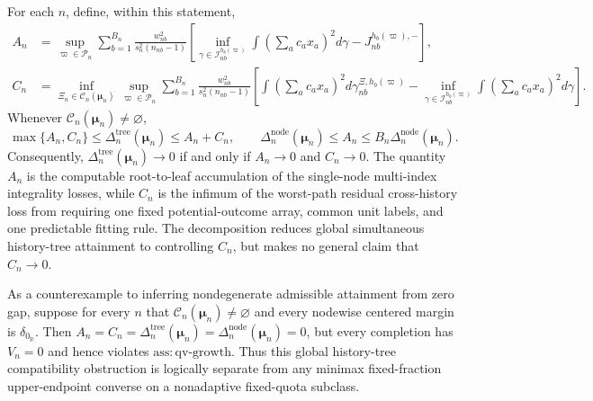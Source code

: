For each \(n\), define, within this statement,
\[
 \begin{aligned}
 A_n&=\sup_{\varpi\in\mathcal P_n}\sum_{b=1}^{B_n}
 \frac{w_{nb}^2}{s_n^2(n_{nb}-1)}\left[
 \inf_{\gamma\in\mathcal I_{nb}^{h_b(\varpi)}}\int\left(\sum_ac_ax_a\right)^2d\gamma-J_{nb}^{h_b(\varpi),-}\right],\\
 C_n&=\inf_{\Xi_n\in\mathcal C_n(\boldsymbol\mu_n)}\sup_{\varpi\in\mathcal P_n}
 \sum_{b=1}^{B_n}\frac{w_{nb}^2}{s_n^2(n_{nb}-1)}\left[
 \int\left(\sum_ac_ax_a\right)^2d\gamma_{nb}^{\Xi,h_b(\varpi)}
 -\inf_{\gamma\in\mathcal I_{nb}^{h_b(\varpi)}}\int\left(\sum_ac_ax_a\right)^2d\gamma\right].
 \end{aligned}
\]
Whenever \(\mathcal C_n(\boldsymbol\mu_n)\ne\varnothing\),
\[
 \max\{A_n,C_n\}\le\Delta_n^{\mathrm{tree}}(\boldsymbol\mu_n)\le A_n+C_n,
 \qquad
 \Delta_n^{\mathrm{node}}(\boldsymbol\mu_n)\le A_n\le B_n\Delta_n^{\mathrm{node}}(\boldsymbol\mu_n).
\]
Consequently, \(\Delta_n^{\mathrm{tree}}(\boldsymbol\mu_n)\to0\) if and only if \(A_n\to0\) and \(C_n\to0\).  The quantity \(A_n\) is the computable root-to-leaf accumulation of the single-node multi-index integrality losses, while \(C_n\) is the infimum of the worst-path residual cross-history loss from requiring one fixed potential-outcome array, common unit labels, and one predictable fitting rule.  The decomposition reduces global simultaneous history-tree attainment to controlling \(C_n\), but makes no general claim that \(C_n\to0\).

As a counterexample to inferring nondegenerate admissible attainment from zero gap, suppose for every \(n\) that \(\mathcal C_n(\boldsymbol\mu_n)\ne\varnothing\) and every nodewise centered margin is \(\delta_{0_{\mathbb R}}\).  Then \(A_n=C_n=\Delta_n^{\mathrm{tree}}(\boldsymbol\mu_n)=\Delta_n^{\mathrm{node}}(\boldsymbol\mu_n)=0\), but every completion has \(V_n=0\) and hence violates \(\mathrm{ass:qv\text{-}growth}\).  Thus this global history-tree compatibility obstruction is logically separate from any minimax fixed-fraction upper-endpoint converse on a nonadaptive fixed-quota subclass.